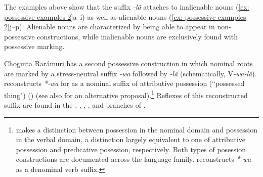                                                                 \label{ex: possessive examples 2o}
                                                            \label{ex: possessive examples 2p}
    \z
\z

The examples above show that the suffix \textit{-lâ} attaches to inalienable nouns (\ref{ex: possessive examples 2}a--i) as well as alienable nouns (\ref{ex: possessive examples 2}j--p). Alienable nouns are characterized by being able to appear in non-possessive constructions, while inalienable nouns are exclusively found with possessive marking.

\largerpage
Choguita Rarámuri has a second possessive construction in which nominal roots are marked by a stress-neutral suffix \textit{-wa} followed by \textit{-lâ} (schematically, V\textit{-wa-lâ}). \citet{haugen2017derived} reconstructs \textit{*-wa} for  as a nominal suffix of attributive possession (``possessed thing") (\citeyear[172]{haugen2017derived}) (see also \citealt{langacker1977uto} for an alternative proposal).\footnote{\citet{haugen2017derived}
    makes a distinction between possession in the nominal domain and possession in the verbal domain, a distinction largely equivalent to one of attributive possession and predicative posession, respectively. Both types of posession constructions are documented across the  language family. \citet{langacker1977uto} reconstructs \textit{*-wa} as a denominal verb suffix.
} Reflexes of this reconstructed suffix are found in the , , , , and  branches of  \citep[][186]{haugen2017derived}.

